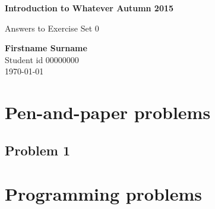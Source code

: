 \documentclass[12pt]{article}
\newcommand{\Student}{Firstname Surname}
\newcommand{\StudentId}{00000000}
\newcommand{\CourseName}{Introduction to Whatever \hfill Autumn 2015}
\newcommand{\ProblemSet}{Answers to Exercise Set 0}
\begin{document}

    \noindent
    {\bf \CourseName}

    \noindent
    \ProblemSet

    \bigskip

    \begin{center}
        {\Large \bf \Student} \\
        Student id \StudentId \\
        \today
    \end{center}

    \tableofcontents

    \newpage


    \section{Pen-and-paper problems}
    \label{sec:pen_and_paper_problems}


    \subsection{Problem 1}
    \label{sub:problem_1}

    \section{Programming problems}
    \label{sec:programming_problems}
\end{document}

